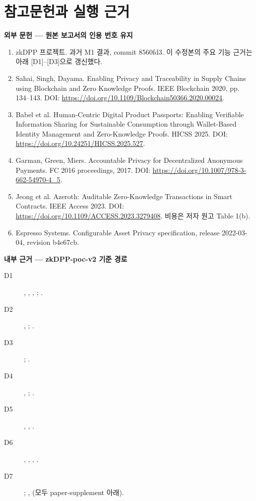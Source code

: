 \section*{참고문헌과 실행 근거}
\textbf{외부 문헌 — 원본 보고서의 인용 번호 유지}
\begin{enumerate}
    \item zkDPP 프로젝트. 과거 M1 결과, commit 8560fd3. 이 수정본의 주요 기능 근거는 아래 [D1]--[D3]으로 갱신했다.
    \item Sahai, Singh, Dayama. Enabling Privacy and Traceability in Supply Chains using Blockchain and Zero Knowledge Proofs. IEEE Blockchain 2020, pp. 134--143. DOI: \url{https://doi.org/10.1109/Blockchain50366.2020.00024}.
    \item Babel et al. Human-Centric Digital Product Passports: Enabling Verifiable Information Sharing for Sustainable Consumption through Wallet-Based Identity Management and Zero-Knowledge Proofs. HICSS 2025. DOI: \url{https://doi.org/10.24251/HICSS.2025.527}.
    \item Garman, Green, Miers. Accountable Privacy for Decentralized Anonymous Payments. FC 2016 proceedings, 2017. DOI: \url{https://doi.org/10.1007/978-3-662-54970-4_5}.
    \item Jeong et al. Azeroth: Auditable Zero-Knowledge Transactions in Smart Contracts. IEEE Access 2023. DOI: \url{https://doi.org/10.1109/ACCESS.2023.3279408}. 비용은 저자 원고 Table 1(b).
    \item Espresso Systems. Configurable Asset Privacy specification, release 2022-03-04, revision b4e67cb.
\end{enumerate}
\textbf{내부 근거 — zkDPP-poc-v2 기준 경로}
\begin{description}
    \item[D1] , , , ; .
    \item[D2] , ; .
    \item[D3] ; .
    \item[D4] , ; .
    \item[D5] , , .
    \item[D6] , , , .
    \item[D7] ; , (모두 paper-supplement 아래).
\end{description}
